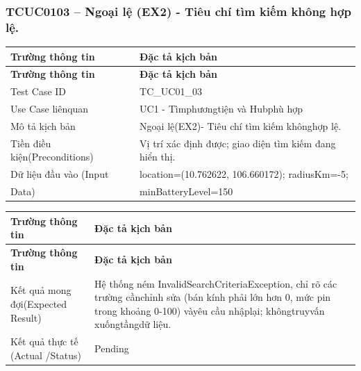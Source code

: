 \subsubsection{TCUC0103 – Ngoại lệ (EX2) - Tiêu chí tìm kiếm không hợp lệ.}
\begin{longtable}{|L{0.24\textwidth}|L{0.70\textwidth}|}
\hline
\textbf{Trường thông tin} & \textbf{Đặc tả kịch bản} \\
\hline
\endfirsthead
\hline
\textbf{Trường thông tin} & \textbf{Đặc tả kịch bản} \\
\hline
\endhead
Test Case ID & TC\_UC01\_03 \\
\hline
Use Case liênquan & UC1 - Tìmphươngtiện và Hubphù hợp \\
\hline
Mô tả kịch bản & Ngoại lệ(EX2)- Tiêu chí tìm kiếm khônghợp lệ. \\
\hline
Tiền điều kiện\newline (Preconditions) & Vị trí xác định được; giao diện tìm kiếm đang hiển thị. \\
\hline
Dữ liệu đầu vào (Input & location=(10.762622, 106.660172); radiusKm=-5; \\
\hline
Data) & minBatteryLevel=150 \\
\hline
\end{longtable}
\vspace{-0.5\baselineskip}
\begin{longtable}{|L{0.24\textwidth}|L{0.70\textwidth}|}
\hline
\textbf{Trường thông tin} & \textbf{Đặc tả kịch bản} \\
\hline
\endfirsthead
\hline
\textbf{Trường thông tin} & \textbf{Đặc tả kịch bản} \\
\hline
\endhead
Kết quả mong đợi\newline (Expected Result) & Hệ thống ném InvalidSearchCriteriaException, chỉ rõ các trường cần\newline chỉnh sửa (bán kính phải lớn hơn 0, mức pin trong khoảng 0-100) và\newline yêu cầu nhậplại; khôngtruyvấn xuốngtầngdữ liệu. \\
\hline
Kết quả thực tế (Actual /\newline Status) & Pending \\
\hline
\end{longtable}
\vspace{-0.5\baselineskip}
